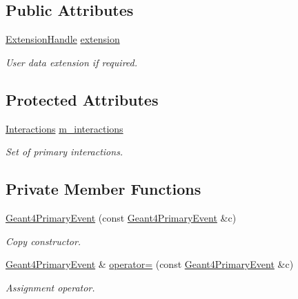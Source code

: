 \subsection*{Public Attributes}
\begin{DoxyCompactItemize}
\item 
\hyperlink{class_d_d4hep_1_1_simulation_1_1_geant4_primary_event_acfe0b3b7ad6f183fe75a6539b4470418}{Extension\+Handle} \hyperlink{class_d_d4hep_1_1_simulation_1_1_geant4_primary_event_a91db5fc340c2b13402f920b62ba45eb9}{extension}
\begin{DoxyCompactList}\small\item\em User data extension if required. \end{DoxyCompactList}\end{DoxyCompactItemize}
\subsection*{Protected Attributes}
\begin{DoxyCompactItemize}
\item 
\hyperlink{class_d_d4hep_1_1_simulation_1_1_geant4_primary_event_adae96b166507159c2dd92b4e20352a52}{Interactions} \hyperlink{class_d_d4hep_1_1_simulation_1_1_geant4_primary_event_accff0a45f858135ce13050e2b1cdb706}{m\+\_\+interactions}
\begin{DoxyCompactList}\small\item\em Set of primary interactions. \end{DoxyCompactList}\end{DoxyCompactItemize}
\subsection*{Private Member Functions}
\begin{DoxyCompactItemize}
\item 
\hyperlink{class_d_d4hep_1_1_simulation_1_1_geant4_primary_event_ae55dce4a449fe6d48475fa3a785d7be4}{Geant4\+Primary\+Event} (const \hyperlink{class_d_d4hep_1_1_simulation_1_1_geant4_primary_event}{Geant4\+Primary\+Event} \&c)
\begin{DoxyCompactList}\small\item\em Copy constructor. \end{DoxyCompactList}\item 
\hyperlink{class_d_d4hep_1_1_simulation_1_1_geant4_primary_event}{Geant4\+Primary\+Event} \& \hyperlink{class_d_d4hep_1_1_simulation_1_1_geant4_primary_event_af01ff35982390af71d52773488027179}{operator=} (const \hyperlink{class_d_d4hep_1_1_simulation_1_1_geant4_primary_event}{Geant4\+Primary\+Event} \&c)
\begin{DoxyCompactList}\small\item\em Assignment operator. \end{DoxyCompactList}\end{DoxyCompactItemize}


